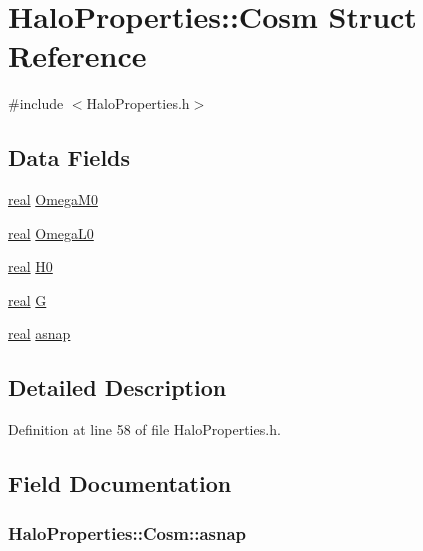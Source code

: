 \section{HaloProperties::Cosm Struct Reference}
\label{structHaloProperties_1_1Cosm}


{\ttfamily \#include $<$HaloProperties.h$>$}

\subsection*{Data Fields}
\begin{DoxyCompactItemize}
\item 
\hyperlink{Global_8h_a031f8951175b43076c2084a6c2173410}{real} \hyperlink{structHaloProperties_1_1Cosm_a04365f2d2c6e73214753d69c700fc4ee}{OmegaM0}
\item 
\hyperlink{Global_8h_a031f8951175b43076c2084a6c2173410}{real} \hyperlink{structHaloProperties_1_1Cosm_a8f7218daf6563a00cc4560fdd389d104}{OmegaL0}
\item 
\hyperlink{Global_8h_a031f8951175b43076c2084a6c2173410}{real} \hyperlink{structHaloProperties_1_1Cosm_a23e9404205e6f953f71bf99f137ae687}{H0}
\item 
\hyperlink{Global_8h_a031f8951175b43076c2084a6c2173410}{real} \hyperlink{structHaloProperties_1_1Cosm_a67202a34a6239a8fbe67ebab2e83c02f}{G}
\item 
\hyperlink{Global_8h_a031f8951175b43076c2084a6c2173410}{real} \hyperlink{structHaloProperties_1_1Cosm_abf2cc3240f1474f92d3e85cff808a6b4}{asnap}
\end{DoxyCompactItemize}


\subsection{Detailed Description}


Definition at line 58 of file HaloProperties.h.



\subsection{Field Documentation}
\subsubsection[{asnap}]{ {\bf HaloProperties::Cosm::asnap}}\label{structHaloProperties_1_1Cosm_abf2cc3240f1474f92d3e85cff808a6b4}


